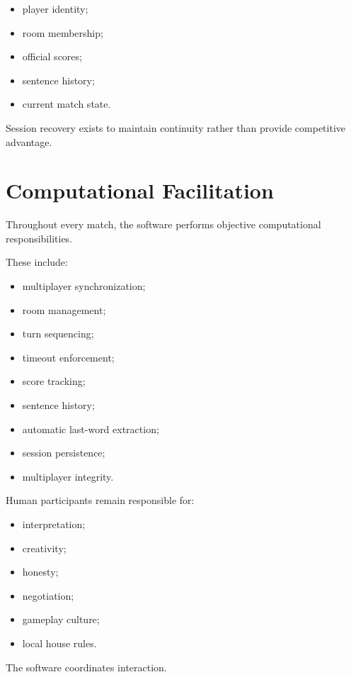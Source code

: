\documentclass[11pt,a4paper]{article}
\begin{document}
\begin{itemize}
    \item player identity;
    \item room membership;
    \item official scores;
    \item sentence history;
    \item current match state.
\end{itemize}

Session recovery exists to maintain continuity rather than provide competitive advantage.

\section{Computational Facilitation}

Throughout every match, the software performs objective computational responsibilities.

These include:

\begin{itemize}
    \item multiplayer synchronization;
    \item room management;
    \item turn sequencing;
    \item timeout enforcement;
    \item score tracking;
    \item sentence history;
    \item automatic last-word extraction;
    \item session persistence;
    \item multiplayer integrity.
\end{itemize}

Human participants remain responsible for:

\begin{itemize}
    \item interpretation;
    \item creativity;
    \item honesty;
    \item negotiation;
    \item gameplay culture;
    \item local house rules.
\end{itemize}

The software coordinates interaction.
\end{document}
